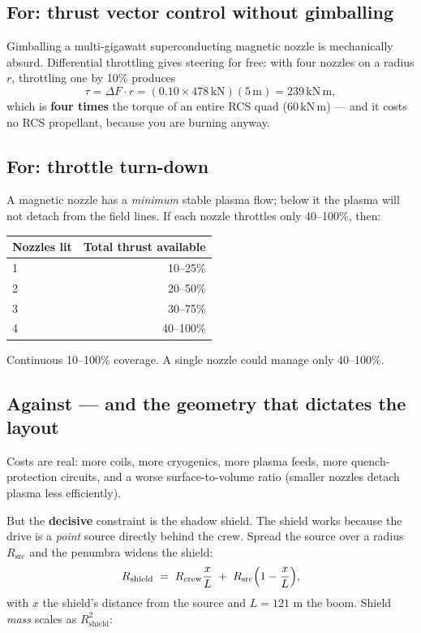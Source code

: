 \documentclass[11pt]{article}
\newcommand{\unit}[1]{\,\mathrm{#1}}
\begin{document}
\subsection{For: thrust vector control without gimballing}
Gimballing a multi-gigawatt superconducting magnetic nozzle is mechanically absurd. Differential throttling gives steering for free: with four nozzles on a radius $r$, throttling one by 10\% produces
\begin{equation}
\tau = \Delta F \cdot r = (0.10 \times 478\unit{kN})(5\unit{m}) = 239\unit{kN\,m},
\end{equation}
which is \textbf{four times} the torque of an entire RCS quad ($60\unit{kN\,m}$) --- and it costs no RCS propellant, because you are burning anyway.

\subsection{For: throttle turn-down}
A magnetic nozzle has a \emph{minimum} stable plasma flow; below it the plasma will not detach from the field lines. If each nozzle throttles only 40--100\%, then:
\begin{center}\small
\begin{tabular}{@{}lr@{}}
\toprule
Nozzles lit & Total thrust available\\
\midrule
1 & 10--25\%\\ 2 & 20--50\%\\ 3 & 30--75\%\\ 4 & 40--100\%\\
\bottomrule
\end{tabular}
\end{center}
Continuous 10--100\% coverage. A single nozzle could manage only 40--100\%.

\subsection{Against --- and the geometry that dictates the layout}
Costs are real: more coils, more cryogenics, more plasma feeds, more quench-protection circuits, and a worse surface-to-volume ratio (smaller nozzles detach plasma less efficiently).

But the \textbf{decisive} constraint is the shadow shield. The shield works because the drive is a \emph{point} source directly behind the crew. Spread the source over a radius $R_{\text{src}}$ and the penumbra widens the shield:
\begin{equation}
R_{\text{shield}} \;=\; R_{\text{crew}}\frac{x}{L} \;+\; R_{\text{src}}\Bigl(1-\frac{x}{L}\Bigr),
\end{equation}
with $x$ the shield's distance from the source and $L=121$ m the boom. Shield \emph{mass} scales as $R_{\text{shield}}^2$:
\end{document}
